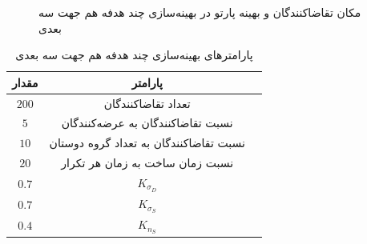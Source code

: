 \begin{figure}[H]
	\centering
	\hfill
	\caption{مکان تقاضا‌کنندگان و بهینه پارتو در بهینه‌سازی چند هدفه هم جهت سه بعدی}
\end{figure}





\begin{table}[H]
	\caption{پارامترهای بهینه‌سازی چند هدفه هم جهت سه بعدی}
	\centering
	\begin{tabular}{|c|c|c|}
		\hline
		مقدار & پارامتر\\
		\hline
		$200$ 
		& تعداد تقاضا‌کنندگان\\
		$5$ 
		& نسبت تقاضاکنندگان به عرضه‌کنندگان \\
		$	10 $
		& نسبت تقاضاکنندگان به تعداد گروه دوستان\\
		$20$ 
		& نسبت زمان ساخت به زمان هر تکرار \\
		$0.7 $ &$K_{\sigma_D}$ \\
		$0.7$ &$K_{\sigma_S}$ \\
		$0.4$ &$K_{n_S}$ \\
		
		\hline
	\end{tabular}
\end{table}



